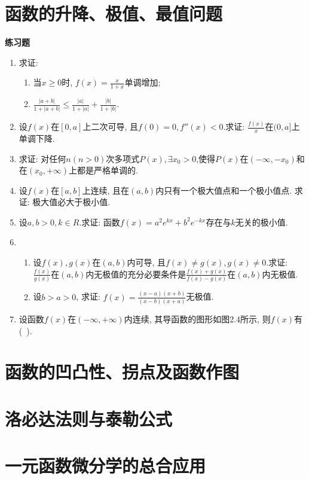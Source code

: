 \section{函数的升降、极值、最值问题}
\centering\textbf{练习题}
\begin{enumerate}
	\item 求证: 
	\begin{enumerate}
		\item 当$x\ge 0$时, $f(x)=\frac{x}{1+x}$单调增加;
		\item $\frac{|a+b|}{1+|a+b|}\le \frac{|a|}{1+|a|}+\frac{|b|}{1+|b|}$.
	\end{enumerate}
		\item 设$f(x)$在$[0,a]$上二次可导, 且$f(0)=0, f''(x)<0$.求证: $\frac{f(x)}{x}$在$(0,a]$上单调下降.
		\item 求证: 对任何$n(n>0)$次多项式$P(x),\exists x_0>0$,使得$P(x)$在$(-\infty,-x_0)$和在$(x_0,+\infty)$上都是严格单调的.
		\item 设$f(x)$在$[a,b]$上连续, 且在$(a,b)$内只有一个极大值点和一个极小值点. 求证: 极大值必大于极小值.
		\item 设$a,b>0,k\in R$.求证: 函数$f(x)=a^2e^{kx}+b^2e^{-kx}$存在与$k$无关的极小值.
		\item 
		\begin{enumerate}
			\item 设$f(x), g(x)$在$(a,b)$内可导, 且$f(x)\ne g(x),g(x)\ne 0$.求证: $\frac{f(x)}{g(x)}$在$(a,b)$内无极值的充分必要条件是$\frac{f(x)+g(x)}{f(x)-g(x)}$在$(a,b)$内无极值.
			\item 设$b>a>0$, 求证: $f(x)=\frac{(x-a)(x+b)}{(x-b)(x+a)}$无极值.
		\end{enumerate}
	\item 设函数$f(x)$在$(-\infty,+\infty)$内连续, 其导函数的图形如图2.4所示, 则$f(x)$有(\ ).
\end{enumerate}

\section{函数的凹凸性、拐点及函数作图}

\section{洛必达法则与泰勒公式}

\section{一元函数微分学的总合应用}